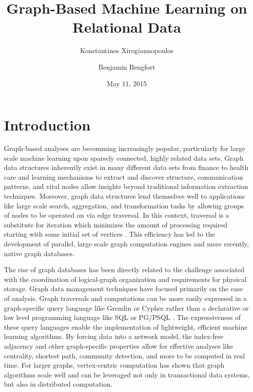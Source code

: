 \documentclass[11pt,letterpaper]{article}
\begin{document}
\title{Graph-Based Machine Learning on Relational Data}

\author[ ]{Konstantinos Xirogiannopoulos}
\author[ ]{Benjamin Bengfort}

\date{May 11, 2015}

\maketitle


\section*{Introduction}

Graph-based analyses are becomming increasingly popular, particularly for large scale machine learning upon sparsely connected, highly related data sets. Graph data structures inherently exist in many different data sets from finance to health care and learning mechanisms to extract and discover structure, communication patterns, and vital nodes allow insights beyond traditional information extraction techniques. Moreover, graph data structures lend themselves well to applications like large scale search, aggregation, and transformation tasks by allowing groups of nodes to be operated on via edge traversal. In this context, traversal is a substitute for iteration which minimizes the amount of processing required starting with some initial set of vertices \cite{berretti_efficient_2001}. This efficiency has led to the development of parallel, large scale graph computation  engines and more recently, native graph databases.


The rise of graph databases has been directly related to the challenge associated with the coordination of logical-graph organization and requirements for physical storage. Graph data management techniques have focused primarily on the ease of analysis. Graph traversals and computations can be more easily expressed in a graph-specific query language like Gremlin \cite{rodriguez_gremlin_2013} or Cypher \cite{miller_graph_2013} rather than a declarative or low level programming language like SQL or PG/PSQL \cite{rodriguez_exploring_2012}. The expressiveness of these query languages enable the implementation of lightweight, efficient machine learning algorithms. By forcing data into a network model, the index-free adjacency and other graph-specific properties allow for effective analyses like centrality, shortest path, community detection, and more to be computed in real time. For larger graphs, vertex-centric computation \cite{malewicz_pregel:_2010} has shown that graph algorithms scale well and can be leveraged not only in transactional data systems, but also in distributed computation.
\end{document}
